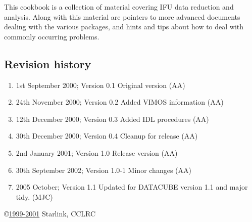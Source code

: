 \documentclass[twoside,11pt]{article}
\newcommand{\stardocinitials}  {SC}
\newcommand{\stardocnumber}    {16.2}
\newcommand{\stardocabstract}
{This cookbook is a collection of material covering IFU data reduction and analysis. Along 
with this material are pointers to more advanced documents dealing with the various packages,
and hints and tips about how to deal with commonly occurring problems.}
\newcommand{\stardocname}{\stardocinitials /\stardocnumber}
\newenvironment{latexonly}{}{}
\newcommand{\latexonlytoc}[0]{\tableofcontents}
\renewcommand{\thepage}{\roman{page}}
\begin{document}
\stardocabstract
 \newpage
 \vspace{3cm}

 \subsection*{Revision history}

 \begin{enumerate}
   \item 1st September 2000; Version 0.1 Original version (AA) 
   \item 24th November 2000; Version 0.2 Added VIMOS information (AA)
   \item 12th December 2000; Version 0.3 Added IDL procedures (AA)
   \item 30th December 2000; Version 0.4 Cleanup for release (AA)
   \item 2nd January 2001; Version 1.0 Release version (AA)
   \item 30th September 2002; Version 1.0-1 Minor changes (AA)
   \item 2005 October; Version 1.1  Updated for DATACUBE version 1.1
                                    and major tidy. (MJC)

 \end{enumerate}

 \vspace{10cm}
 \copyright \underline{1999-2001} Starlink, CCLRC

 \cleardoublepage
 \begin{latexonly}
   \setlength{\parskip}{0mm}
   \latexonlytoc

   \newpage
   \listoffigures

   \setlength{\parskip}{\medskipamount}
   \markright{\stardocname}
 \end{latexonly}

\cleardoublepage
\newpage
\renewcommand{\thepage}{\arabic{page}}
\setcounter{page}{1}

\end{document}
